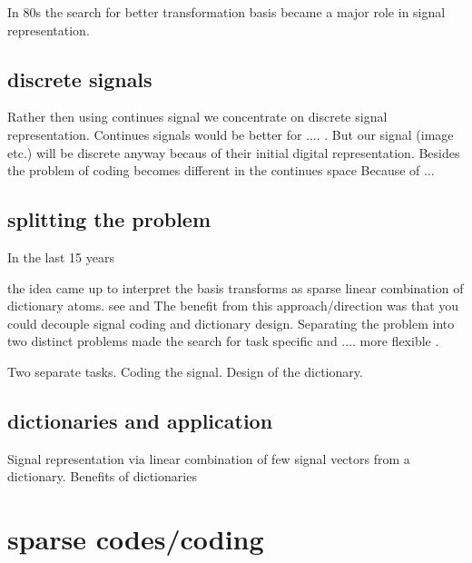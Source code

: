 In 80s the search for better transformation basis became a major role in signal representation. \cite{}

\subsection{discrete signals}
Rather then using continues signal we concentrate on discrete signal representation.
Continues signals would be better for .... . But our signal (image etc.) will be discrete anyway becaus of their initial digital representation. 
Besides the problem of coding becomes different in the continues space \cite{} Because of ...

\subsection{splitting the problem}
\cite{Rubinstein2010}
In the last 15 years 

the idea came up to interpret the basis transforms as sparse linear combination of dictionary atoms.
see \cite{Olshausen1997} and \cite{}
The benefit from this approach/direction was that you could decouple signal coding and dictionary design.
Separating the problem into two distinct problems made the search for task specific and .... more flexible \cite{?}.

Two separate tasks.
Coding the signal. Design of the dictionary.

\subsection{dictionaries and application}
Signal representation via linear combination of few signal vectors from a dictionary.
Benefits of dictionaries


\section{sparse codes/coding}


